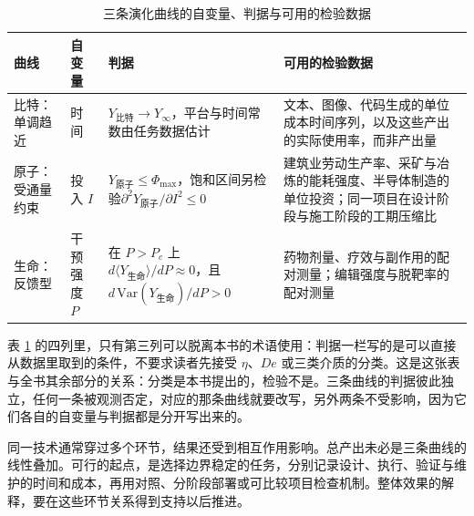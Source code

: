 \begin{table}[ht]
\centering
\caption{三条演化曲线的自变量、判据与可用的检验数据}
\label{tab:scaling-laws}
{\small
\begin{tabularx}{\textwidth}{@{}>{\RaggedRight\arraybackslash}p{2.45cm} >{\RaggedRight\arraybackslash}p{1.9cm} >{\RaggedRight\arraybackslash}p{4.0cm} >{\RaggedRight\arraybackslash}X@{}}
\toprule
曲线 & 自变量 & 判据 & 可用的检验数据 \\
\midrule
比特：单调趋近 & 时间 & $Y_{\text{比特}}\to Y_{\infty}$，平台与时间常数由任务数据估计 & 文本、图像、代码生成的单位成本时间序列，以及这些产出的实际使用率，而非产出量 \\
原子：受通量约束 & 投入 $I$ & $Y_{\text{原子}}\le\Phi_{\max}$，饱和区间另检验$\partial^{2}Y_{\text{原子}}/\partial I^{2}\le0$ & 建筑业劳动生产率、采矿与冶炼的能耗强度、半导体制造的单位投资；同一项目在设计阶段与施工阶段的工期压缩比 \\
生命：反馈型 & 干预强度 $P$ & 在 $P>P_{c}$ 上 $d\langle Y_{\text{生命}}\rangle/dP\approx0$，且 $d\,\mathrm{Var}(Y_{\text{生命}})/dP>0$ & 药物剂量、疗效与副作用的配对测量；编辑强度与脱靶率的配对测量 \\
\bottomrule
\end{tabularx}}
\end{table}

表 \ref{tab:scaling-laws} 的四列里，只有第三列可以脱离本书的术语使用：判据一栏写的是可以直接从数据里取到的条件，不要求读者先接受 $\eta$、$De$ 或三类介质的分类。这是这张表与全书其余部分的关系：分类是本书提出的，检验不是。三条曲线的判据彼此独立，任何一条被观测否定，对应的那条曲线就要改写，另外两条不受影响，因为它们各自的自变量与判据都是分开写出来的。

同一技术通常穿过多个环节，结果还受到相互作用影响。总产出未必是三条曲线的线性叠加。可行的起点，是选择边界稳定的任务，分别记录设计、执行、验证与维护的时间和成本，再用对照、分阶段部署或可比较项目检查机制。整体效果的解释，要在这些环节关系得到支持以后推进。
